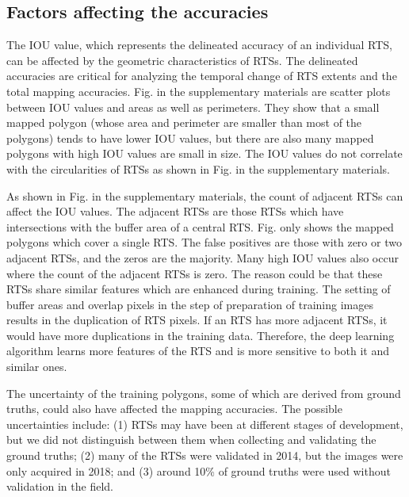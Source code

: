 \documentclass[authoryear,preprint,review,12pt]{elsarticle}
\begin{document}
\subsection{Factors affecting the accuracies}
\label{subsec_acc_factors}

The IOU value, which represents the delineated accuracy of an individual RTS, can be affected by the geometric characteristics of RTSs.
The delineated accuracies are critical for analyzing the temporal change of RTS extents and the total mapping accuracies.
Fig.  in the supplementary materials are scatter plots between IOU values and areas as well as perimeters. They show that a small mapped polygon (whose area and perimeter are smaller than most of the polygons) tends to have lower IOU values, but there are also many mapped polygons with high IOU values are small in size. 
The IOU values do not correlate with the circularities of RTSs as shown in Fig.  in the supplementary materials. 


As shown in Fig.  in the supplementary materials, the count of adjacent RTSs can affect the IOU values. The adjacent RTSs are those RTSs which have intersections with the buffer area of a central RTS. Fig.  only shows the mapped polygons which cover a single RTS. The false positives are those with zero or two adjacent RTSs, and the zeros are the majority. Many high IOU values also occur where the count of the adjacent RTSs is zero. The reason could be that these RTSs share similar features which are enhanced during training. The setting of buffer areas and overlap pixels in the step of preparation of training images results in the duplication of RTS pixels. If an RTS has more adjacent RTSs, it would have more duplications in the training data. Therefore, the deep learning algorithm learns more features of the RTS and is more sensitive to both it and similar ones. 

The uncertainty of the training polygons, some of which are derived from ground truths, could also have affected the mapping accuracies. The possible uncertainties include: (1) RTSs may have been at different stages of development, but we did not distinguish between them when collecting and validating the ground truths; (2) many of the RTSs were validated in 2014, but the images were only acquired in 2018; and (3) around 10\% of ground truths were used without validation in the field. 
\end{document}
